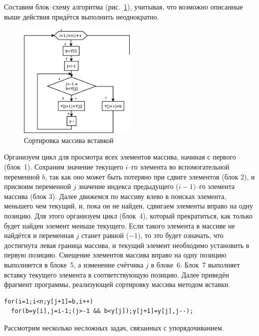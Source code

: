 Составим блок–схему алгоритма (рис.~\ref{ch05:refDrawing13}), учитывая, что возможно описанные выше действия придётся
выполнить неоднократно.

\begin{figure}[htb]
\begin{center}
\includegraphics[width=0.5\textwidth]{img/ris_5_14}
\caption{Сортировка массива вставкой}
\label{ch05:refDrawing13}
\end{center}
\end{figure}


 Организуем цикл для просмотра всех элементов массива, начиная с первого (блок~1). Сохраним значение текущего
$i$–го элемента во вспомогательной переменной $b$, так как оно может быть потеряно
при сдвиге элементов (блок 2), и присвоим переменной $j$ значение индекса предыдущего
($i-1)$–го элемента массива (блок 3). Далее движемся по массиву влево в поисках элемента, меньшего чем
текущий, и, пока он не найден, сдвигаем элементы вправо на одну позицию. Для этого организуем цикл (блок~4), который
прекратиться, как только будет найден элемент меньше текущего. Если такого элемента в массиве не найдётся и переменная
$j$ станет равной ($-1$), то это будет означать, что достигнута левая граница массива, и текущий элемент
необходимо установить в первую позицию. Смещение элементов массива вправо на одну позицию выполняется в блоке~5, а
изменение счётчика $j$ в блоке~6. Блок~7 выполняет вставку текущего элемента в соответствующую
позицию.
Далее приведён фрагмент программы, реализующей сортировку массива методом вставки.
\begin{lstlisting}
for(i=1;i<n;y[j+1]=b,i++) 
  for(b=y[i],j=i-1;(j>-1 && b<y[j]);y[j+1]=y[j],j--);
\end{lstlisting}

Рассмотрим несколько несложных задач, связанных с упорядочиванием.


